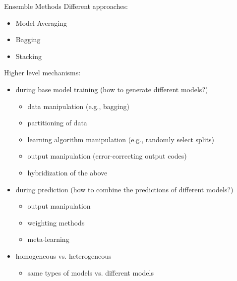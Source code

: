 \documentclass[11pt,compress,t,notes=noshow, aspectratio=169, xcolor=table]{beamer}
\begin{document}
\begin{vbframe}{Ensemble Methods}
Different approaches:
\begin{itemize}
\item Model Averaging
\item Bagging
\item Stacking
\end{itemize}
\vspace{1em}
Higher level mechanisms:
\begin{itemize}
    \begin{itemize}
        \item during base model training (how to generate different models?)
        \begin{itemize}
            \item data manipulation (e.g., bagging)
            \item partitioning of data
            \item learning algorithm manipulation (e.g., randomly select splits)
            \item output manipulation (error-correcting output codes)
            \item hybridization of the above
        \end{itemize}
        \item during prediction (how to combine the predictions of different models?)
        \begin{itemize}
            \item output manipulation
            \item weighting methods
            \item meta-learning
        \end{itemize}
        \item homogeneous vs. heterogeneous
        \begin{itemize}
            \item same types of models vs. different models
        \end{itemize}
    \end{itemize}
\end{itemize}
 \end{vbframe}

\end{document}

